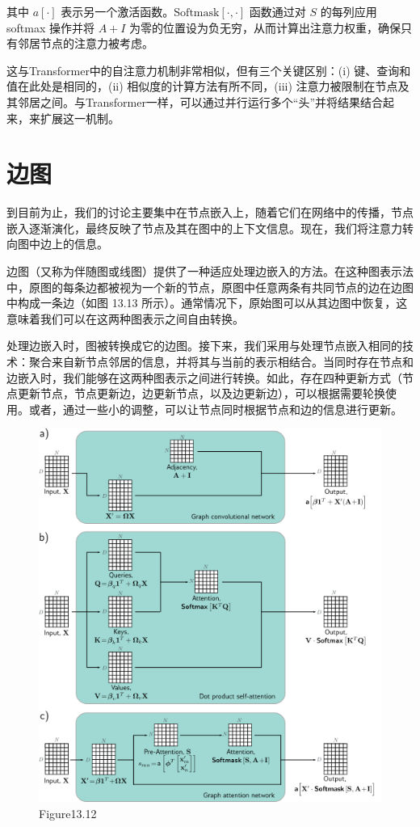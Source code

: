 其中 \(a[\cdot]\) 表示另一个激活函数。\(\text{Softmask}[\cdot,\cdot]\) 函数通过对 \(S\) 的每列应用 softmax 操作并将 \(A + I\) 为零的位置设为负无穷，从而计算出注意力权重，确保只有邻居节点的注意力被考虑。

这与Transformer中的自注意力机制非常相似，但有三个关键区别：(i) 键、查询和值在此处是相同的，(ii) 相似度的计算方法有所不同，(iii) 注意力被限制在节点及其邻居之间。与Transformer一样，可以通过并行运行多个“头”并将结果结合起来，来扩展这一机制。

\section{边图}
到目前为止，我们的讨论主要集中在节点嵌入上，随着它们在网络中的传播，节点嵌入逐渐演化，最终反映了节点及其在图中的上下文信息。现在，我们将注意力转向图中边上的信息。

边图（又称为伴随图或线图）提供了一种适应处理边嵌入的方法。在这种图表示法中，原图的每条边都被视为一个新的节点，原图中任意两条有共同节点的边在边图中构成一条边（如图 13.13 所示）。通常情况下，原始图可以从其边图中恢复，这意味着我们可以在这两种图表示之间自由转换。

处理边嵌入时，图被转换成它的边图。接下来，我们采用与处理节点嵌入相同的技术：聚合来自新节点邻居的信息，并将其与当前的表示相结合。当同时存在节点和边嵌入时，我们能够在这两种图表示之间进行转换。如此，存在四种更新方式（节点更新节点，节点更新边，边更新节点，以及边更新边），可以根据需要轮换使用。或者，通过一些小的调整，可以让节点同时根据节点和边的信息进行更新。

\begin{figure}[ht!]
\centering
\includegraphics[width=0.7\linewidth]{png/chapter13/GraphTransformer.png}
\caption{Figure13.12}
\end{figure}

